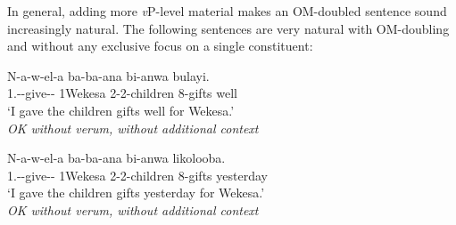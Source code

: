\documentclass[output=paper]{langscibook}
\begin{document}
\z 

\noindent In general, adding more \textit{v}P-level material makes an OM-doubled sentence sound increasingly natural. The following sentences are very natural with OM-doubling and without any exclusive focus on a single constituent:

\ea 
\begin{xlist}

\ex 
\gll N-a-w-el-a  ba-ba-ana bi-anwa bulayi. \\
1\Sg.\Sm-\Om-give-\Appl-\Fv{} 1Wekesa 2-2-children 8-gifts well \\
\glt `I gave the children gifts well for Wekesa.' \\ \textit{OK without verum, without additional context}

\ex 
\gll N-a-w-el-a  ba-ba-ana bi-anwa likolooba. \\
1\Sg.\Sm-\Om-give-\Appl-\Fv{} 1Wekesa 2-2-children 8-gifts yesterday  \\
\glt `I gave the children gifts yesterday for Wekesa.' \\ \textit{OK without verum, without additional context}


\end{xlist}
\z 






\end{document}
